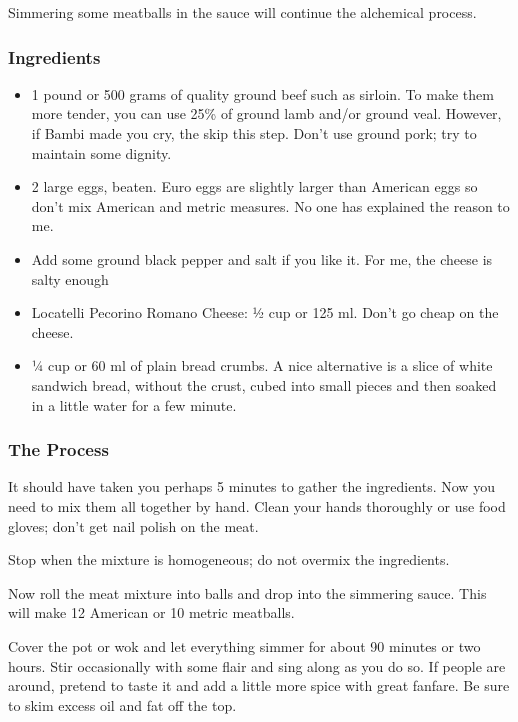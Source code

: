 Simmering some meatballs in the sauce will continue the alchemical process.

\subsubsection{Ingredients}


\begin{itemize}


\item 1 pound or 500 grams of quality ground beef such as sirloin. To make them more tender, you can use 25\% of ground lamb and/or ground veal. However, if Bambi made you cry, the skip this step. Don't use ground pork; try to maintain some dignity.

\item 2 large eggs, beaten. Euro eggs are slightly larger than American eggs so don't mix American and metric measures. No one has explained the reason to me.

\item Add some ground black pepper and salt if you like it. For me, the cheese is salty enough

\item Locatelli Pecorino Romano Cheese: ½ cup or 125 ml. Don't go cheap on the cheese.

\item ¼ cup or 60 ml of plain bread crumbs. A nice alternative is a slice of white sandwich bread, without the crust, cubed into small pieces and then soaked in a little water for a few minute.
\end{itemize}


\subsubsection{The Process}


It should have taken you perhaps 5 minutes to gather the ingredients. Now you need to mix them all together by hand. Clean your hands thoroughly or use food gloves; don't get nail polish on the meat.

Stop when the mixture is homogeneous; do not overmix the ingredients.

Now roll the meat mixture into balls and drop into the simmering sauce. This will make 12 American or 10 metric meatballs.

Cover the pot or wok and let everything simmer for about 90 minutes or two hours. Stir occasionally with some flair and sing along as you do so. If people are around, pretend to taste it and add a little more spice with great fanfare. Be sure to skim excess oil and fat off the top.

